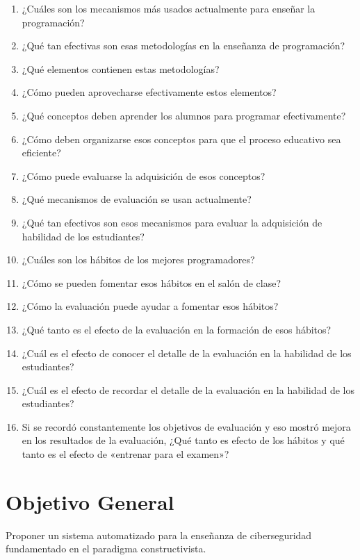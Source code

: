 \documentclass[
  12,
]{scrartcl}
\providecommand{\tightlist}{%
  \setlength{\itemsep}{0pt}\setlength{\parskip}{0pt}}
\begin{document}
\begin{enumerate}
\def\labelenumi{\arabic{enumi}.}
\tightlist
\item
  ¿Cuáles son los mecanismos más usados actualmente para enseñar la
  programación?
\item
  ¿Qué tan efectivas son esas metodologías en la enseñanza de
  programación?
\item
  ¿Qué elementos contienen estas metodologías?
\item
  ¿Cómo pueden aprovecharse efectivamente estos elementos?
\item
  ¿Qué conceptos deben aprender los alumnos para programar
  efectivamente?
\item
  ¿Cómo deben organizarse esos conceptos para que el proceso educativo
  sea eficiente?
\item
  ¿Cómo puede evaluarse la adquisición de esos conceptos?
\item
  ¿Qué mecanismos de evaluación se usan actualmente?
\item
  ¿Qué tan efectivos son esos mecanismos para evaluar la adquisición de
  habilidad de los estudiantes?
\item
  ¿Cuáles son los hábitos de los mejores programadores?
\item
  ¿Cómo se pueden fomentar esos hábitos en el salón de clase?
\item
  ¿Cómo la evaluación puede ayudar a fomentar esos hábitos?
\item
  ¿Qué tanto es el efecto de la evaluación en la formación de esos
  hábitos?
\item
  ¿Cuál es el efecto de conocer el detalle de la evaluación en la
  habilidad de los estudiantes?
\item
  ¿Cuál es el efecto de recordar el detalle de la evaluación en la
  habilidad de los estudiantes?
\item
  Si se recordó constantemente los objetivos de evaluación y eso mostró
  mejora en los resultados de la evaluación, ¿Qué tanto es efecto de los
  hábitos y qué tanto es el efecto de «entrenar para el examen»?
\end{enumerate}

\newpage

\hypertarget{objetivo-general}{%
\section{Objetivo General}\label{objetivo-general}}

Proponer un sistema automatizado para la enseñanza de ciberseguridad
fundamentado en el paradigma constructivista.
\end{document}
